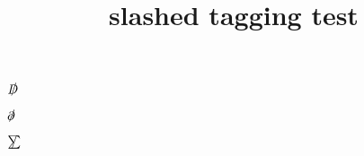 \documentclass{article}
\title{slashed tagging test}
\begin{document}
$\slashed{D}$

$\slashed{\partial}$

$\slashed{\sum}$
\end{document}
